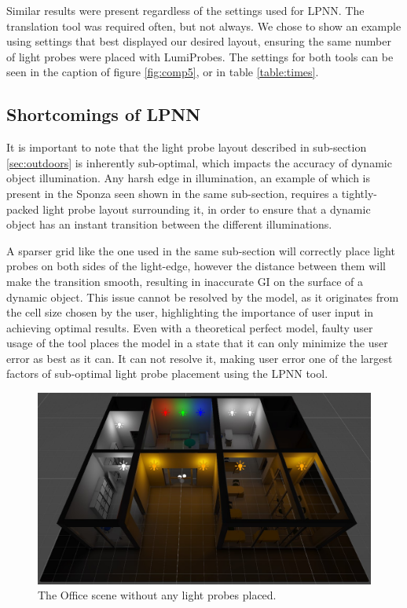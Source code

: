 Similar results were present regardless of the settings used for LPNN. The translation tool was required often, but not always. We chose to show an example using settings that best displayed our desired layout, ensuring the same number of light probes were placed with LumiProbes. The settings for both tools can be seen in the caption of figure \ref{fig:comp5}, or in table \ref{table:times}.

\subsection{Shortcomings of LPNN}

It is important to note that the light probe layout described in sub-section \ref{sec:outdoors} is inherently sub-optimal, which impacts the accuracy of dynamic object illumination. Any harsh edge in illumination, an example of which is present in the Sponza seen shown in the same sub-section, requires a tightly-packed light probe layout surrounding it, in order to ensure that a dynamic object has an instant transition between the different illuminations.

A sparser grid like the one used in the same sub-section will correctly place light probes on both sides of the light-edge, however the distance between them will make the transition smooth, resulting in inaccurate GI on the surface of a dynamic object. This issue cannot be resolved by the model, as it originates from the cell size chosen by the user, highlighting the importance of user input in achieving optimal results. Even with a theoretical perfect model, faulty user usage of the tool places the model in a state that it can only minimize the user error as best as it can. It can not resolve it, making user error one of the largest factors of sub-optimal light probe placement using the LPNN tool.\newline

\begin{figure}[h]
	\centering
	\includegraphics[width=\linewidth]{Graphics/results/office.jpg}
	\caption{The Office scene \parencite{Office2021} without any light probes placed.}
	\label{fig:office}
\end{figure}

